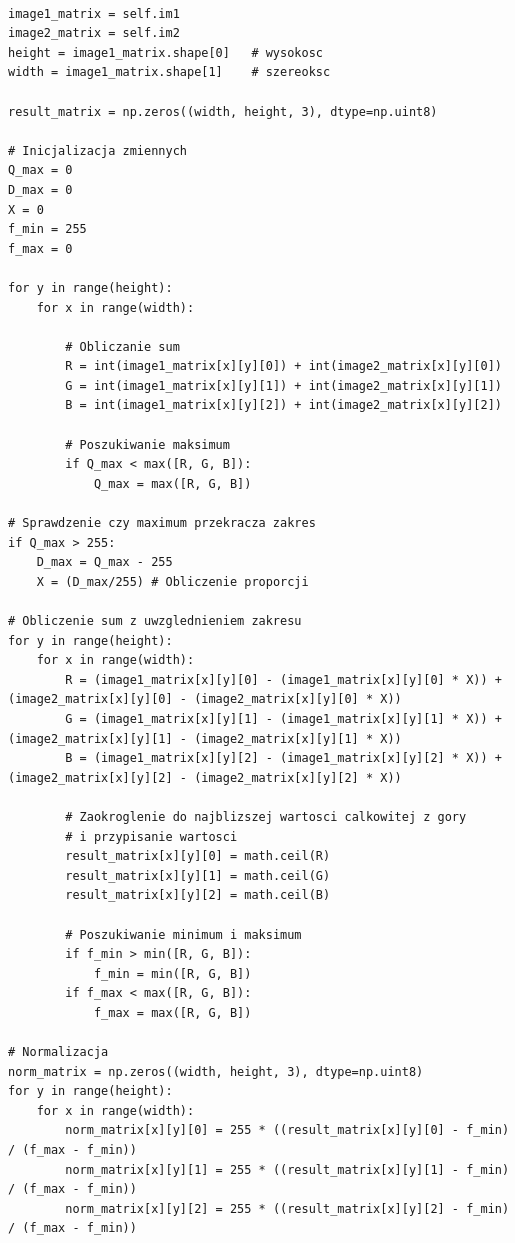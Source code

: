 \documentclass[final,a4paper,openany,12pt]{mwbk}
\begin{document}
\begin{lstlisting}[caption=Sumowanie obrazów barwowych]

image1_matrix = self.im1
image2_matrix = self.im2
height = image1_matrix.shape[0]   # wysokosc
width = image1_matrix.shape[1]    # szereoksc

result_matrix = np.zeros((width, height, 3), dtype=np.uint8)

# Inicjalizacja zmiennych
Q_max = 0
D_max = 0
X = 0
f_min = 255
f_max = 0

for y in range(height):
    for x in range(width):  

        # Obliczanie sum
        R = int(image1_matrix[x][y][0]) + int(image2_matrix[x][y][0])
        G = int(image1_matrix[x][y][1]) + int(image2_matrix[x][y][1])
        B = int(image1_matrix[x][y][2]) + int(image2_matrix[x][y][2])
        
        # Poszukiwanie maksimum               
        if Q_max < max([R, G, B]):
            Q_max = max([R, G, B])

# Sprawdzenie czy maximum przekracza zakres
if Q_max > 255:
    D_max = Q_max - 255
    X = (D_max/255) # Obliczenie proporcji

# Obliczenie sum z uwzglednieniem zakresu
for y in range(height):
    for x in range(width): 
        R = (image1_matrix[x][y][0] - (image1_matrix[x][y][0] * X)) + (image2_matrix[x][y][0] - (image2_matrix[x][y][0] * X))
        G = (image1_matrix[x][y][1] - (image1_matrix[x][y][1] * X)) + (image2_matrix[x][y][1] - (image2_matrix[x][y][1] * X))
        B = (image1_matrix[x][y][2] - (image1_matrix[x][y][2] * X)) + (image2_matrix[x][y][2] - (image2_matrix[x][y][2] * X))

        # Zaokroglenie do najblizszej wartosci calkowitej z gory
        # i przypisanie wartosci
        result_matrix[x][y][0] = math.ceil(R)
        result_matrix[x][y][1] = math.ceil(G)
        result_matrix[x][y][2] = math.ceil(B)

        # Poszukiwanie minimum i maksimum                
        if f_min > min([R, G, B]):
            f_min = min([R, G, B])
        if f_max < max([R, G, B]):
            f_max = max([R, G, B])

# Normalizacja
norm_matrix = np.zeros((width, height, 3), dtype=np.uint8)
for y in range(height):
    for x in range(width):
        norm_matrix[x][y][0] = 255 * ((result_matrix[x][y][0] - f_min) / (f_max - f_min))
        norm_matrix[x][y][1] = 255 * ((result_matrix[x][y][1] - f_min) / (f_max - f_min))
        norm_matrix[x][y][2] = 255 * ((result_matrix[x][y][2] - f_min) / (f_max - f_min))

\end{lstlisting}
\newpage
\end{document}
